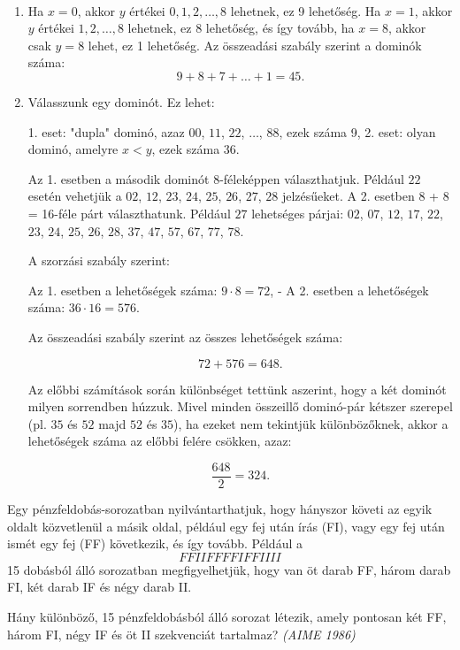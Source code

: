 \begin{solution}
~
\begin{enumerate}
\item Ha $x=0$, akkor $y$ értékei $0,1,2,\dots,8$ lehetnek, ez 9 lehetőség.
Ha $x=1$, akkor $y$ értékei $1,2,\dots,8$ lehetnek, ez 8 lehetőség,
és így tovább, ha $x=8$, akkor csak $y=8$ lehet, ez 1 lehetőség.
Az összeadási szabály szerint a dominók száma:
\[
9+8+7+\dots+1=45.
\]
\item Válasszunk egy dominót. Ez lehet:

1. eset: "dupla" dominó, azaz $00$, $11$, $22$, $\dots$, $88$,
ezek száma 9, 2. eset: olyan dominó, amelyre $x<y$, ezek száma 36.

Az 1. esetben a második dominót 8-féleképpen választhatjuk. Például
$22$ esetén vehetjük a $02$, $12$, $23$, $24$, $25$, $26$,
$27$, $28$ jelzésűeket. A 2. esetben 8 + 8 = 16-féle párt választhatunk.
Például $27$ lehetséges párjai: $02$, $07$, $12$, $17$, $22$,
$23$, $24$, $25$, $26$, $28$, $37$, $47$, $57$, $67$, $77$,
$78$.

A szorzási szabály szerint:

Az 1. esetben a lehetőségek száma: $9\cdot8=72$, - A 2. esetben
a lehetőségek száma: $36\cdot16=576$.

Az összeadási szabály szerint az összes lehetőségek száma:

\[
72+576=648.
\]

Az előbbi számítások során különbséget tettünk aszerint, hogy a két
dominót milyen sorrendben húzzuk. Mivel minden összeillő dominó-pár
kétszer szerepel (pl. $35$ és $52$ majd $52$ és $35$), ha ezeket
nem tekintjük különbözőknek, akkor a lehetőségek száma az előbbi felére
csökken, azaz:

\[
\frac{648}{2}=324.
\]

\end{enumerate}
\end{solution}
\begin{extraproblem}
Egy pénzfeldobás-sorozatban nyilvántarthatjuk, hogy hányszor követi
az egyik oldalt közvetlenül a másik oldal, például egy fej után írás
(FI), vagy egy fej után ismét egy fej (FF) következik, és így tovább.
Például a 
\[
FFIIFFFFIFFIIII
\]
15 dobásból álló sorozatban megfigyelhetjük, hogy van öt darab FF,
három darab FI, két darab IF és négy darab II.

Hány különböző, 15 pénzfeldobásból álló sorozat létezik, amely pontosan
két FF, három FI, négy IF és öt II szekvenciát tartalmaz? \emph{(AIME
1986)}
\end{extraproblem}

